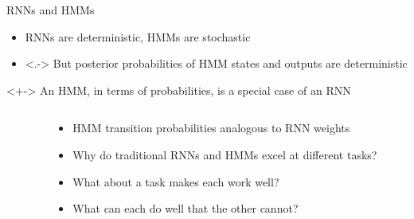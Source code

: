 \begin{frame}{RNNs and HMMs}
    \begin{itemize}
        \item<+-> RNNs are deterministic, HMMs are stochastic
        \item<.-> But posterior probabilities of HMM states and outputs are deterministic
    \end{itemize}

    \begin{block}{}<+->
        An HMM, in terms of probabilities, is a special case of an RNN
    \end{block}

    \begin{columns}
        \begin{column}{0.53\textwidth}
            
        \end{column}
        \begin{column}{0.47\textwidth}
            \begin{itemize}[<.->]
                \item HMM transition probabilities analogous to RNN weights
                \item<+-> Why do traditional RNNs and HMMs excel at different tasks?
                \item What about a task makes each work well?
                \item What can each do well that the other cannot?
            \end{itemize}
        \end{column}
    \end{columns}
\end{frame}

